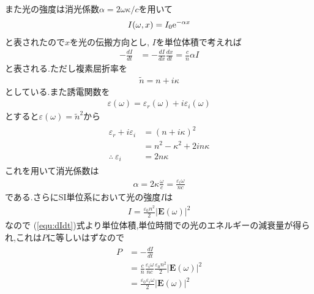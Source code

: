 \documentclass[uplatex,a4j,11pt,dvipdfmx]{jsarticle}
\begin{document}
また光の強度は消光係数$\alpha=2\omega\kappa/c$を用いて
\begin{align}
  I(\omega,x)=I_0{\rm e}^{-\alpha x}
\end{align}
と表されたので$x$を光の伝搬方向とし, $I$を単位体積で考えれば
\begin{align}
  \label{equ:dIdt}
  -\frac{dI}{dt}&=-\frac{dI}{dx}\frac{dx}{dt}=\frac{c}{n}\alpha I
\end{align}
と表される.ただし複素屈折率を
\begin{align}
  \tilde{n}=n+i\kappa
\end{align}
としている.また誘電関数を
\begin{align}
  \varepsilon(\omega)=\varepsilon_r(\omega)+i\varepsilon_i(\omega)
\end{align}
とすると$\varepsilon(\omega)=\tilde{n}^2$から
\begin{align}
  \begin{split}
    \varepsilon_r+i\varepsilon_i&=(n+i\kappa)^2\\
    &=n^2-\kappa^2+2in\kappa\\
    \therefore\ \varepsilon_i&=2n\kappa
  \end{split}
\end{align}
これを用いて消光係数は
\begin{align}
  \alpha=2\kappa\frac{\omega}{c}=\frac{\varepsilon_i\omega}{nc}
\end{align}
である.さらにSI単位系において光の強度$I$は
\begin{align}
  I=\frac{\varepsilon_0n^2}{2}|{\bm E}(\omega)|^2
\end{align}
なので
(\ref{equ:dIdt})式より単位体積,単位時間での光のエネルギーの減衰量が得られ,これは$P$に等しいはずなので
\begin{align}
  \begin{split}
    P&=-\frac{dI}{dt}\\
    &=\frac{c}{n}\frac{\varepsilon_i\omega}{nc}\frac{\varepsilon_0n^2}{2}|{\bm E}(\omega)|^2\\
    &=\frac{\varepsilon_0\varepsilon_i\omega}{2}|{\bm E}(\omega)|^2
  \end{split}
\end{align}
\end{document}
